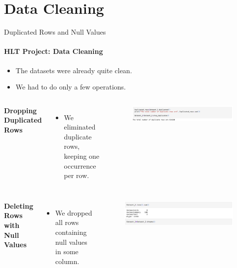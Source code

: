 \documentclass{beamer}
\theoremstyle{definition}
\theoremstyle{plain}
\begin{document}
\section{Data Cleaning}

\begin{frame}{Duplicated Rows and Null Values}
\framesubtitle{HLT Project: Data Cleaning}
{\small 

\begin{itemize}
    \item The datasets were already quite clean.
    \item We had to do only a few operations.
\end{itemize}

\vspace{0.2cm}
\begin{columns}
    \textbf{Dropping Duplicated Rows}

     \begin{itemize}
         \item We eliminated duplicate rows, keeping one occurrence per row.
     \end{itemize}

    \begin{figure}
        \centering
        \includegraphics[scale=0.25]{Figures/duplicate.png}
    \end{figure}
\end{columns}
\vspace{0.3cm}
\begin{columns}
    \textbf{Deleting Rows with Null Values}
    \begin{itemize}
         \item We dropped all rows containing null values in some column.
     \end{itemize}

    \begin{figure}
        \centering
        \includegraphics[scale=0.25]{Figures/null_values.png}
    \end{figure}
\end{columns}

}
\end{frame}
\end{document}
